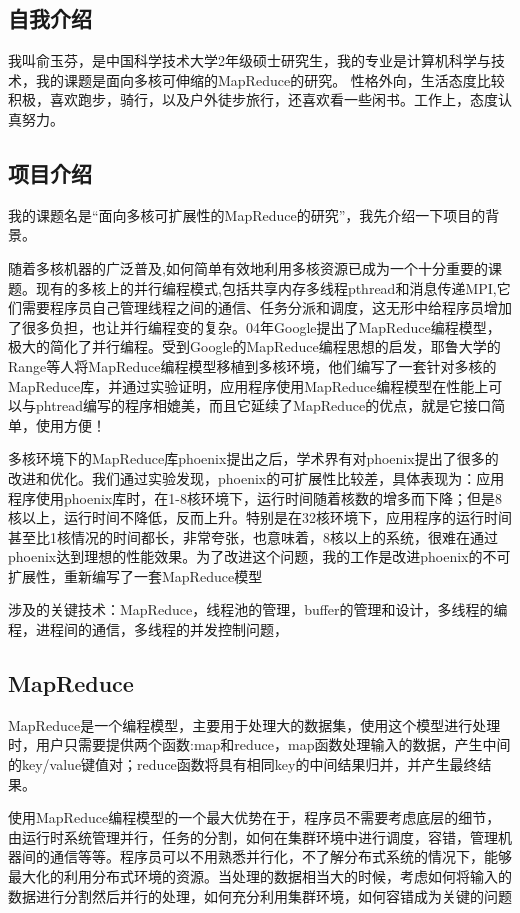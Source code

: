 \subsection{自我介绍}
我叫俞玉芬，是中国科学技术大学2年级硕士研究生，我的专业是计算机科学与技术，我的课题是面向多核可伸缩的MapReduce的研究。
性格外向，生活态度比较积极，喜欢跑步，骑行，以及户外徒步旅行，还喜欢看一些闲书。工作上，态度认真努力。

\subsection{项目介绍}
我的课题名是“面向多核可扩展性的MapReduce的研究”，我先介绍一下项目的背景。

随着多核机器的广泛普及,如何简单有效地利用多核资源已成为一个十分重要的课题。现有的多核上的并行编程模式,包括共享内存多线程pthread和消息传递MPI,它们需要程序员自己管理线程之间的通信、任务分派和调度，这无形中给程序员增加了很多负担，也让并行编程变的复杂。04年Google提出了MapReduce编程模型，极大的简化了并行编程。受到Google的MapReduce编程思想的启发，耶鲁大学的Range等人将MapReduce编程模型移植到多核环境，他们编写了一套针对多核的MapReduce库，并通过实验证明，应用程序使用MapReduce编程模型在性能上可以与phtread编写的程序相媲美，而且它延续了MapReduce的优点，就是它接口简单，使用方便！

多核环境下的MapReduce库phoenix提出之后，学术界有对phoenix提出了很多的改进和优化。我们通过实验发现，phoenix的可扩展性比较差，具体表现为：应用程序使用phoenix库时，在1-8核环境下，运行时间随着核数的增多而下降；但是8核以上，运行时间不降低，反而上升。特别是在32核环境下，应用程序的运行时间甚至比1核情况的时间都长，非常夸张，也意味着，8核以上的系统，很难在通过phoenix达到理想的性能效果。为了改进这个问题，我的工作是改进phoenix的不可扩展性，重新编写了一套MapReduce模型

涉及的关键技术：MapReduce，线程池的管理，buffer的管理和设计，多线程的编程，进程间的通信，多线程的并发控制问题，

\subsection{MapReduce}
MapReduce是一个编程模型，主要用于处理大的数据集，使用这个模型进行处理时，用户只需要提供两个函数:map和reduce，map函数处理输入的数据，产生中间的key/value键值对；reduce函数将具有相同key的中间结果归并，并产生最终结果。

使用MapReduce编程模型的一个最大优势在于，程序员不需要考虑底层的细节，由运行时系统管理并行，任务的分割，如何在集群环境中进行调度，容错，管理机器间的通信等等。程序员可以不用熟悉并行化，不了解分布式系统的情况下，能够最大化的利用分布式环境的资源。当处理的数据相当大的时候，考虑如何将输入的数据进行分割然后并行的处理，如何充分利用集群环境，如何容错成为关键的问题

